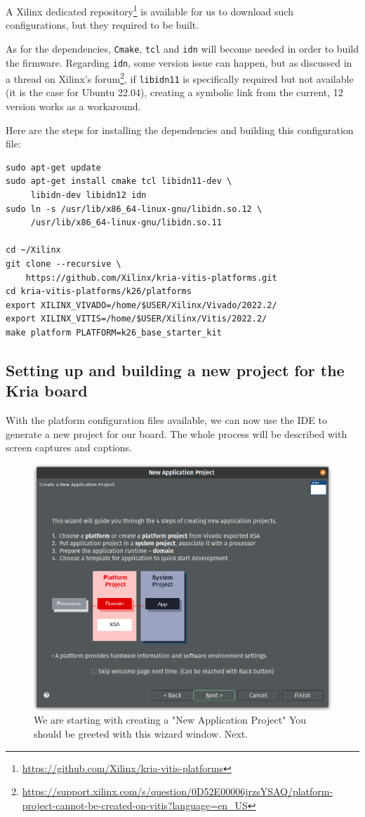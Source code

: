 \documentclass[10pt]{article}
\begin{document}
A Xilinx dedicated repository\footnote{\url{https://github.com/Xilinx/kria-vitis-platforms}} is available for us to download  such configurations,
but they required to be built.

As for the dependencies, \texttt{Cmake}, \texttt{tcl} and \texttt{idn} will become needed in order to build the firmware.
Regarding \texttt{idn}, some version issue can happen, but as discussed in a thread on Xilinx's forum\footnote{\url{https://support.xilinx.com/s/question/0D52E00006jrzsYSAQ/platform-project-cannot-be-created-on-vitis?language=en\_US}},
if \texttt{libidn11} is specifically required but not available (it is the case for Ubuntu 22.04),
creating a symbolic link from the current, 12 version works as a workaround.

Here are the steps for installing the dependencies and building this configuration file:

\begin{verbatim}
sudo apt-get update
sudo apt-get install cmake tcl libidn11-dev \
     libidn-dev libidn12 idn
sudo ln -s /usr/lib/x86_64-linux-gnu/libidn.so.12 \
     /usr/lib/x86_64-linux-gnu/libidn.so.11

cd ~/Xilinx
git clone --recursive \
    https://github.com/Xilinx/kria-vitis-platforms.git
cd kria-vitis-platforms/k26/platforms
export XILINX_VIVADO=/home/$USER/Xilinx/Vivado/2022.2/
export XILINX_VITIS=/home/$USER/Xilinx/Vitis/2022.2/
make platform PLATFORM=k26_base_starter_kit
\end{verbatim}

\subsection{Setting up and building a new project for the Kria board}
\label{sec:orga19dbdc}
With the platform configuration files available, we can now use the IDE to generate a
new project for our board. The whole process will be described with screen captures and
captions.

\begin{figure}[htbp]
\centering
\includegraphics[width=.6\textwidth]{./img/vitis_new/project1.png}
\caption{\label{fig:org5b0f64a}We are starting with creating a "New Application Project" You should be greeted with this wizard window. Next.}
\end{figure}
\end{document}
